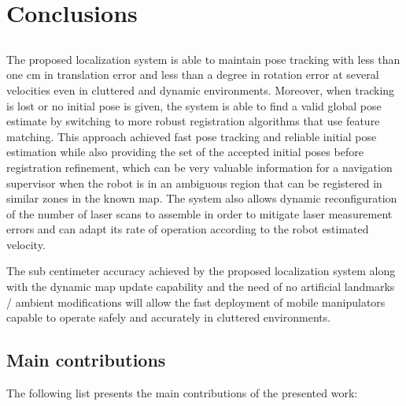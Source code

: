 \chapter{Conclusions} \label{chap:conclusions-and-future-work}



\section*{}

The proposed localization system is able to maintain pose tracking with less than one cm in translation error and less than a degree in rotation error at several velocities even in cluttered and dynamic environments. Moreover, when tracking is lost or no initial pose is given, the system is able to find a valid global pose estimate by switching to more robust registration algorithms that use feature matching. This approach achieved fast pose tracking and reliable initial pose estimation while also providing the set of the accepted initial poses before registration refinement, which can be very valuable information for a navigation supervisor when the robot is in an ambiguous region that can be registered in similar zones in the known map. The system also allows dynamic reconfiguration of the number of laser scans to assemble in order to mitigate laser measurement errors and can adapt its rate of operation according to the robot estimated velocity.

The sub centimeter accuracy achieved by the proposed localization system along with the dynamic map update capability and the need of no artificial landmarks / ambient modifications will allow the fast deployment of mobile manipulators capable to operate safely and accurately in cluttered environments.



\section{Main contributions}


The following list presents the main contributions of the presented work:

